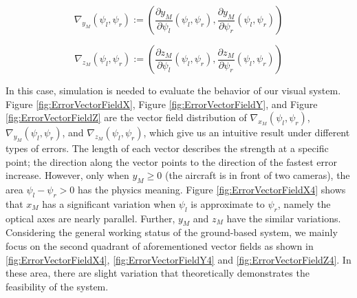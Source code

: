 \documentclass[journal,article,submit,moreauthors,pdftex,10pt,a4paper]{mdpi}
\begin{document}
\begin{equation}
	\nabla_{y_M}(\psi_l, \psi_r):=\left( \frac{\partial y_M}{\partial \psi_l}(\psi_l, \psi_r), \frac{\partial y_M}{\partial \psi_r}(\psi_l, \psi_r)  \right)
\end{equation}

\begin{equation}
	\nabla_{z_M}(\psi_l, \psi_r):=\left( \frac{\partial z_M}{\partial \psi_l}(\psi_l, \psi_r), \frac{\partial z_M}{\partial \psi_r}(\psi_l, \psi_r)  \right)
\end{equation}


In this case, simulation is needed to evaluate the behavior of our visual system. Figure  \ref{fig:ErrorVectorFieldX}, Figure  \ref{fig:ErrorVectorFieldY}, and Figure  \ref{fig:ErrorVectorFieldZ} are the vector field distribution of $\nabla_{x_M}(\psi_l, \psi_r)$, $\nabla_{y_M}(\psi_l, \psi_r)$, and $\nabla_{z_M}(\psi_l, \psi_r)$, which give us an intuitive result under different types of errors. The length of each vector describes the strength at a specific point; the direction along the vector points to the direction of the fastest error increase. However, only when $y_M \geq 0$ (the aircraft is in front of two cameras), the area $\psi_l - \psi_r > 0$ has the physics meaning. Figure  \ref{fig:ErrorVectorFieldX4} shows that $x_M$ has a significant variation when $\psi_l$ is approximate to $\psi_r$, namely the optical axes are nearly parallel. Further, $y_M$ and $z_M$ have the similar variations. Considering the general working status of the ground-based system, we mainly focus on the second  quadrant of aforementioned vector fields as shown in \ref{fig:ErrorVectorFieldX4}, \ref{fig:ErrorVectorFieldY4} and \ref{fig:ErrorVectorFieldZ4}. In these area, there are slight variation that theoretically demonstrates the feasibility of the system. 

 
\end{document}
